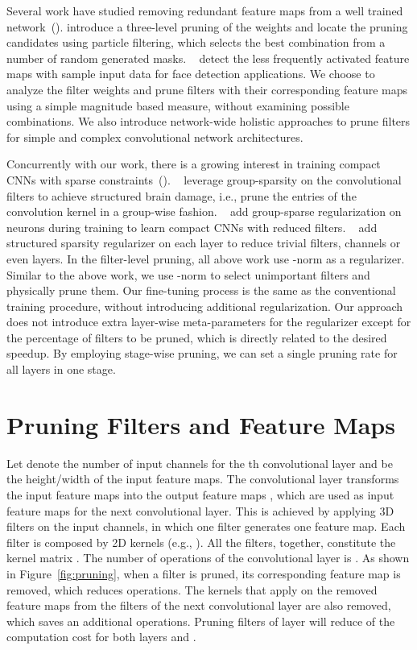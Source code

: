 \documentclass{article} \usepackage{iclr2017_conference,times}
\begin{document}
Several work have studied removing redundant feature maps from a well trained network~(\cite{anwar2015structured,polyak2015channel}).
\cite{anwar2015structured} introduce a three-level pruning of the weights and locate the pruning candidates using particle filtering, which selects the best combination from a number of random generated masks. 
~\cite{polyak2015channel} detect the less frequently activated feature maps with sample input data for face detection applications.
We choose to analyze the filter weights and prune filters with their corresponding feature maps using a simple magnitude based measure, without examining possible combinations.
We also introduce network-wide holistic approaches to prune filters for simple and complex convolutional network architectures.

Concurrently with our work, there is a growing interest in training compact CNNs with sparse constraints~(\cite{group_brain_damage,compactcnn,structured_sparsity_nips16}).
~\cite{group_brain_damage} leverage group-sparsity on the convolutional filters to achieve structured brain damage, i.e., prune the entries of the convolution kernel in a group-wise fashion.
~\cite{compactcnn} add group-sparse regularization on neurons during training to learn compact CNNs with reduced filters.
~\cite{structured_sparsity_nips16} add structured sparsity regularizer on each layer to reduce trivial filters, channels or even layers. 
In the filter-level pruning, all above work use -norm as a regularizer.
Similar to the above work, we use -norm to select unimportant filters and physically prune them.
Our fine-tuning process is the same as the conventional training procedure, without introducing additional regularization.
Our approach does not introduce extra layer-wise meta-parameters for the regularizer except for the percentage of filters to be pruned, which is directly related to the desired speedup.
By employing stage-wise pruning, we can set a single pruning rate for all layers in one stage.
 \section{Pruning Filters and Feature Maps}


Let  denote the number of input channels for the th convolutional layer and  be the height/width of the input feature maps.
The convolutional layer transforms the input feature maps  into the output feature maps , which are used as input feature maps for the next convolutional layer.
This is achieved by applying  3D filters  on the  input channels, in which one filter generates one feature map.
Each filter is composed by  2D kernels  (e.g., ).
All the filters, together, constitute the kernel matrix .
The number of operations of the convolutional layer is .
As shown in Figure~\ref{fig:pruning}, when a filter  is pruned, its corresponding feature map  is removed, which reduces  operations.
The kernels that apply on the removed feature maps from the filters of the next convolutional layer are also removed,
which saves an additional  operations.
Pruning  filters of layer  will reduce  of the computation cost for both layers  and .
\end{document}
